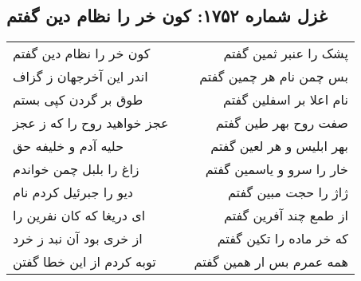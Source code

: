 \begin{center}
\section*{غزل شماره ۱۷۵۲: کون خر را نظام دین گفتم}
\label{sec:1752}
\begin{longtable}{l p{0.5cm} r}
کون خر را نظام دین گفتم
&&
پشک را عنبر ثمین گفتم
\\
اندر این آخرجهان ز گزاف
&&
بس چمن نام هر چمین گفتم
\\
طوق بر گردن کپی بستم
&&
نام اعلا بر اسفلین گفتم
\\
عجز خواهید روح را که ز عجز
&&
صفت روح بهر طین گفتم
\\
حلیه آدم و خلیفه حق
&&
بهر ابلیس و هر لعین گفتم
\\
زاغ را بلبل چمن خواندم
&&
خار را سرو و یاسمین گفتم
\\
دیو را جبرئیل کردم نام
&&
ژاژ را حجت مبین گفتم
\\
ای دریغا که کان نفرین را
&&
از طمع چند آفرین گفتم
\\
از خری بود آن نبد ز خرد
&&
که خر ماده را تکین گفتم
\\
توبه کردم از این خطا گفتن
&&
همه عمرم بس ار همین گفتم
\\
\end{longtable}
\end{center}
